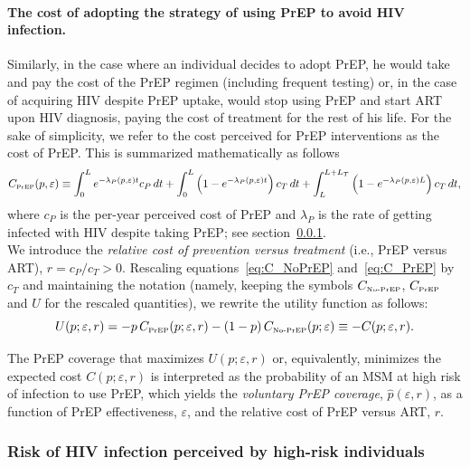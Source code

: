 \documentclass[12pt]{article}
\begin{document}
\paragraph{The cost of adopting the strategy of using PrEP to avoid HIV infection.}

Similarly, in the case where an individual decides to adopt PrEP, he would take and pay the cost of {the PrEP regimen (including frequent testing) or, in the case of acquiring HIV despite PrEP uptake, would stop using PrEP and start ART upon HIV diagnosis, paying} the cost of treatment for the rest of his life. {For the sake of simplicity, we refer to the cost perceived for PrEP interventions as the cost of PrEP}. This is summarized mathematically as follows
\begin{equation} \label{eq:C_PrEP}
	C_{\text{\tiny PrEP}}(p,\varepsilon) \equiv \int_ 0^{L} e^{-\lambda_P(p,\varepsilon) t} c_P \,dt + \int_ 0^{L} \left(1- e^{-\lambda_P(p,\varepsilon) t} \right) c_T \,dt + \int_L^{L+L_T} \left(1- e^{-\lambda_P(p,\varepsilon) L} \right) c_T \,dt,
\end{equation}
where $c_P$ is the per-year perceived cost of PrEP and $\lambda_P$ is the rate of getting infected with HIV despite taking PrEP; see section~\ref{sec:PerceivedRisk}. \\

We introduce the {\it relative cost of prevention versus treatment} (i.e., PrEP versus ART), $r = c_P/c_T>0$. Rescaling equations~\eqref{eq:C_NoPrEP} and~\eqref{eq:C_PrEP} by $c_T$ and maintaining the notation (namely, keeping the symbols $C_{\text{\tiny No-PrEP}}$, $C_{\text{\tiny PrEP}}$ and $U$ for the rescaled quantities), we rewrite the utility function as follows:
\begin{equation}
	U(p;\varepsilon, r) = - p \, C_{\text{\tiny PrEP}}(p;\varepsilon, r) - (1- p) \, C_{\text{\tiny No-PrEP}}(p;\varepsilon)\equiv-C(p;\varepsilon, r).
\end{equation}

The PrEP coverage that maximizes $U(p;\varepsilon, r)$ or, equivalently, minimizes the expected cost $C(p;\varepsilon, r)$ is interpreted as the probability of an MSM at high risk of infection to use PrEP, which yields the {\it voluntary PrEP coverage}, $\hat{p}(\varepsilon,r)$, as a function of PrEP effectiveness, $\varepsilon$, and the relative cost of PrEP versus ART, $r$. 


\subsubsection{Risk of HIV infection perceived by high-risk individuals} \label{sec:PerceivedRisk}
\end{document}
